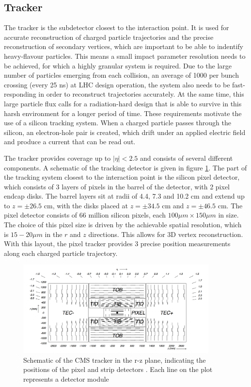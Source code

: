 \subsection{Tracker}
\label{sec:CMSLHC_CMS_tracker}
The tracker \cite{cms-jinst} is the subdetector closest to the interaction point. It
is used for accurate reconstruction of charged particle trajectories and 
the precise reconstruction of secondary vertices, which are important to be
able to indentify heavy-flavour particles. This means a small impact parameter
resolution needs to be achieved, for which a highly granular system is required. 
Due to the large number of particles emerging from 
each collision, an average of 1000 per bunch crossing (every 25 ns) at LHC design operation, the 
system also needs to be fast-responding in order to reconstruct trajectories accurately.
At the same time, this large particle flux calls for a 
radiation-hard design that is able to survive in this harsh environment
for a longer period of time. These requirements motivate the use of a silicon tracking
system. When a charged particle passes through the silicon, an electron-hole pair
is created, which drift under an applied electric field and produce a current
that can be read out. %

The tracker provides coverage up to $|\eta| < 2.5$ and consists of
several different components. A schematic of the tracking detector is given
in figure \ref{fig:CMS_tracker}. The part of the tracking system
closest to the interaction point is the silicon pixel detector, which 
consists of 3 layers of pixels in the barrel of the detector, with 
2 pixel endcap disks. The barrel layers sit at radii of 4.4, 7.3 and 10.2 cm 
and extend up to $z=\pm 26.5$ cm, with the disks placed at $z=\pm 34.5$ cm and
$z=\pm 46.5$ cm. The pixel detector consists of 66 million silicon pixels, each
$100 \mu m \times 150 \mu m$ in size. The choice of this pixel size is driven
by the achievable spatial resolution, which is $15-20 \mu m$ in the $r$ and $z$ directions.
This allows for 3D vertex reconstruction. With this layout, the pixel tracker
provides 3 precise position measurements along each charged particle trajectory.


\begin{figure}[h!]
\begin{center}
\includegraphics[width=0.9\textwidth]{./Detector/Plots/Tracker.png}
\caption{Schematic of the CMS tracker in the r-z plane, indicating the
positions of the pixel and strip detectors \cite{cms-jinst}. Each line 
on the plot represents a detector module}
\label{fig:CMS_tracker}
\end{center}
\end{figure}


